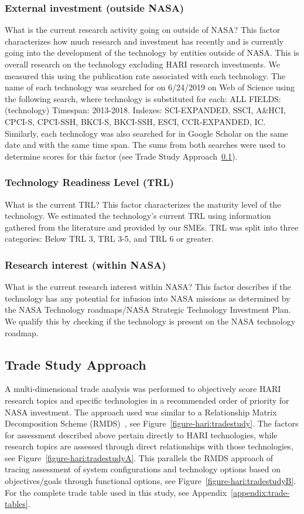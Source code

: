 \subsubsection{External investment (outside NASA)}
What is the current research activity going on outside of NASA? This factor characterizes how much research and investment has recently and is currently going into the development of the technology by entities outside of NASA.
This is overall research on the technology excluding HARI research investments.
We measured this using the publication rate associated with each technology.
The name of each technology was searched for on 6/24/2019 on Web of Science using the following search, where technology is substituted for each:
ALL FIELDS: (technology)
Timespan: 2013-2018.
Indexes: SCI-EXPANDED, SSCI, A\&HCI, CPCI-S, CPCI-SSH, BKCI-S, BKCI-SSH, ESCI, CCR-EXPANDED, IC.
Similarly, each technology was also searched for in Google Scholar on the same date and with the same time span.
The sums from both searches were used to determine scores for this factor (see Trade Study Approach~\ref{ss:tsapproach}).

\subsubsection{Technology Readiness Level (TRL)}
What is the current TRL? This factor characterizes the maturity level of the technology.
We estimated the technology's current TRL using information gathered from the literature and provided by our SMEs.
TRL was split into three categories: Below TRL 3, TRL 3-5, and TRL 6 or greater.

\subsubsection{Research interest (within NASA)}
What is the current research interest within NASA? This factor describes if the technology has any potential for infusion into NASA missions as determined by the NASA Technology roadmaps/NASA Strategic Technology Investment Plan.
We qualify this by checking if the technology is present on the NASA technology roadmap.

\subsection{Trade Study Approach} \label{ss:tsapproach}
A multi-dimensional trade analysis was performed to objectively score HARI research topics and specific technologies in a recommended order of priority for NASA investment.
The approach used was similar to a Relationship Matrix Decomposition Scheme (RMDS)~\citep{boppe_training}, see Figure~\ref{figure-hari:tradestudy}.
The factors for assessment described above pertain directly to HARI technologies, while research topics are assessed through direct relationships with those technologies, see Figure~\ref{figure-hari:tradestudyA}.
This parallels the RMDS approach of tracing assessment of system configurations and technology options based on objectives/goals through functional options, see Figure~\ref{figure-hari:tradestudyB}.
For the complete trade table used in this study, see Appendix~\ref{appendix:trade-tables}.

